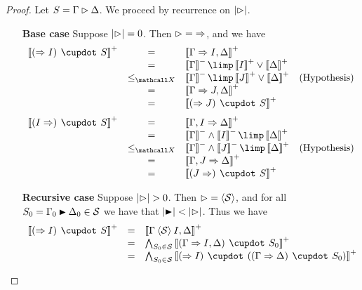\begin{proof}
  Let $S = \Gamma \J \Delta$. We proceed by recurrence on $\bradepth{\J}$.
  \begin{itemize}
    \item[\textbf{Base case}] Suppose $\bradepth{\J} = 0$. Then $\J = {\seq}$,
    and we have
    $$
    \begin{array}{rcll}
      \psint{(\seq I) \mix S}
      &=& \psint{\Gamma \seq I, \Delta} &\\
      &=& \nsint{\Gamma} \limp \psint{I} \lor \psint{\Delta} &\\
      &\sementX& \nsint{\Gamma} \limp \psint{J} \lor \psint{\Delta} &\text{(Hypothesis)}\\
      &=& \psint{\Gamma \seq J, \Delta} &\\
      &=& \psint{(\seq J) \mix S} &
    \end{array}
    $$
    $$
    \begin{array}{rcll}
      \psint{(I \seq) \mix S}
      &=& \psint{\Gamma, I \seq \Delta} &\\
      &=& \nsint{\Gamma} \land \nsint{I} \limp \psint{\Delta} &\\
      &\sementX& \nsint{\Gamma} \land \nsint{J} \limp \psint{\Delta} &\text{(Hypothesis)} \\
      &=& \psint{\Gamma, J \seq \Delta} &\\
      &=& \psint{(J \seq) \mix S} &
    \end{array}
    $$
    \item[\textbf{Recursive case}] Suppose $\bradepth{\J} > 0$. Then $\J =
    {\piq{\cS}}$, and for all $S_0 = \Gamma_0 \JB \Delta_0 \in
    \cS$ we have that $\bradepth{\JB} < \bradepth{\J}$. Thus we have
    $$
    \begin{array}{rcll}
      \psint{(\seq I) \mix S}
      &=& \psint{\Gamma \piq{\cS} I, \Delta} & \\
      &=& \bigwedge_{S_0 \in \cS}{\psint{(\Gamma \seq I, \Delta) \mix S_0}} & \\
      &=& \bigwedge_{S_0 \in \cS}{\psint{(\seq I) \mix ((\Gamma \seq \Delta) \mix S_0)}} & \\

\end{array}$$
\end{itemize}
\end{proof}
